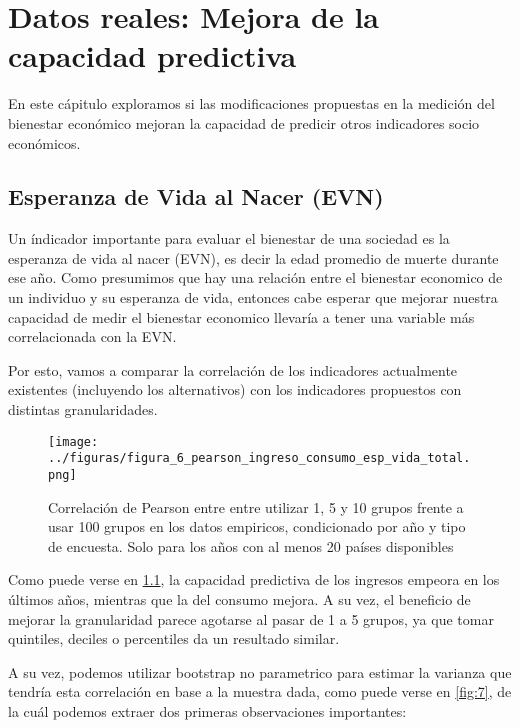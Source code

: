 \chapter{Datos reales: Mejora de la capacidad predictiva} \label{chapter:datos_reales_otros_indicadores}

En este cápitulo exploramos si las modificaciones propuestas en la medición del bienestar económico mejoran la capacidad de predicir otros indicadores socio económicos.

\section{Esperanza de Vida al Nacer (EVN)}

Un índicador importante para evaluar el bienestar de una sociedad es la esperanza de vida al nacer (EVN), es decir la edad promedio de muerte durante ese año. Como presumimos que hay una relación entre el bienestar economico de un individuo y su esperanza de vida, entonces cabe esperar que mejorar nuestra capacidad de medir el bienestar economico llevaría a tener una variable más correlacionada con la EVN.

Por esto, vamos a comparar la correlación de los indicadores actualmente existentes (incluyendo los alternativos) con los indicadores propuestos con distintas granularidades.


\begin{figure}[H] %
    \centering %
    \texttt{[image: ../figuras/figura\_6\_pearson\_ingreso\_consumo\_esp\_vida\_total.png]} %
    \caption{Correlación de Pearson entre entre utilizar 1, 5 y 10 grupos frente a usar 100 grupos en los datos empiricos, condicionado por año y tipo de encuesta. Solo para los años con al menos 20 países disponibles}
    \label{fig:6} %
\end{figure}

Como puede verse en \ref{fig:6}, la capacidad predictiva de los ingresos empeora en los últimos años, mientras que la del consumo mejora. A su vez, el beneficio de mejorar la granularidad parece agotarse al pasar de 1 a 5 grupos, ya que tomar quintiles, deciles o percentiles da un resultado similar.

A su vez, podemos utilizar bootstrap no parametrico para estimar la varianza que tendría esta correlación en base a la muestra dada, como puede verse en \ref{fig:7}, de la cuál podemos extraer dos primeras observaciones importantes:

